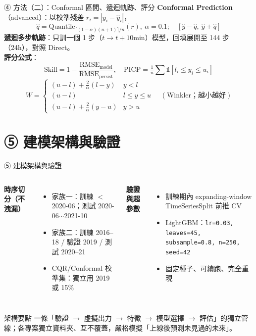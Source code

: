 \documentclass[aspectratio=169,11pt]{beamer}
\begin{document}
\begin{frame}{④ 方法（二）：Conformal 區間、遞迴軌跡、評分}
  \footnotesize
  \textbf{Conformal Prediction}（advanced）：以校準殘差 $r_i=|y_i-\hat y_i|$，
  \[ \hat q=\text{Quantile}_{\lceil(1-\alpha)(n+1)\rceil/n}(r),\ \alpha{=}0.1;\quad [\hat y-\hat q,\ \hat y+\hat q] \]
  \textbf{遞迴多步軌跡}：只訓一個 1 步（$t{\to}t{+}10$min）模型，回填展開至 144 步（24h），對照 Direct。\\[4pt]
  \textbf{評分公式}：
  \[ \text{Skill}=1-\frac{\text{RMSE}_{\text{model}}}{\text{RMSE}_{\text{persist}}},\quad
     \text{PICP}=\tfrac1n\sum\mathbb{1}[l_i\le y_i\le u_i] \]
  \[ W=\begin{cases}(u-l)+\tfrac{2}{\alpha}(l-y)& y<l\\(u-l)& l\le y\le u\\(u-l)+\tfrac{2}{\alpha}(y-u)& y>u\end{cases}
     \quad(\text{Winkler；越小越好}) \]
\end{frame}

\section{⑤ 建模架構與驗證}
\begin{frame}{⑤ 建模架構與驗證}
  \begin{columns}[T]
    \textbf{時序切分（不洩漏）}
    \begin{itemize}\footnotesize
      \item 家族一：訓練 $<$2020-06；測試 2020-06$\sim$2021-10
      \item 家族二：訓練 2016–18 / 驗證 2019 / 測試 2020–21
      \item CQR/Conformal 校準集：獨立用 2019 或 15\%
    \end{itemize}
    \textbf{驗證與超參數}
    \begin{itemize}\footnotesize
      \item 訓練期內 expanding-window TimeSeriesSplit 前推 CV
      \item LightGBM：\texttt{lr=0.03, leaves=45, subsample=0.8, n=250, seed=42}
      \item 固定種子、可續跑、完全重現
    \end{itemize}
  \end{columns}
  \vspace{4pt}
  \begin{block}{架構要點}\footnotesize
  一條「驗證 $\to$ 虛擬出力 $\to$ 特徵 $\to$ 模型選擇 $\to$ 評估」的獨立管線；各專案獨立資料夾、互不覆蓋，嚴格模擬「上線後預測未見過的未來」。
  \end{block}
\end{frame}
\end{document}
